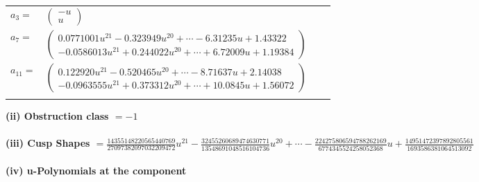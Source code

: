\documentclass[1p]{elsarticle_modified}
\theoremstyle{definition}
\begin{document}
\begin{tabular}{m{7pt} m{180pt} m{7pt} m{180pt} }
\flushright $a_{3}=$&$\begin{pmatrix}- u\\u\end{pmatrix}$ \\
\flushright $a_{7}=$&$\begin{pmatrix}0.0771001 u^{21}-0.323949 u^{20}+\cdots-6.31235 u+1.43322\\-0.0586013 u^{21}+0.244022 u^{20}+\cdots+6.72009 u+1.19384\end{pmatrix}$ \\
\flushright $a_{11}=$&$\begin{pmatrix}0.122920 u^{21}-0.520465 u^{20}+\cdots-8.71637 u+2.14038\\-0.0963555 u^{21}+0.373312 u^{20}+\cdots+10.0845 u+1.56072\end{pmatrix}$\\&\end{tabular}
\flushleft \textbf{(ii) Obstruction class $= -1$}\\~\\
\flushleft \textbf{(iii) Cusp Shapes $= \frac{14355148220565440769}{27097382097032209472} u^{21}-\frac{32455260689474630771}{13548691048516104736} u^{20}+\cdots-\frac{224275806594788262169}{6774345524258052368} u+\frac{14951472397892805561}{1693586381064513092}$}\\~\\
\newpage\renewcommand{\arraystretch}{1}
\flushleft \textbf{(iv) u-Polynomials at the component}\newline \\
\end{document}
